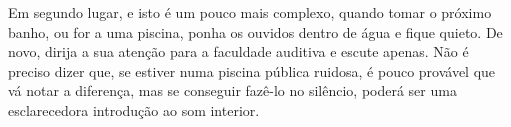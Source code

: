 Em segundo lugar, e isto é um pouco mais complexo, quando tomar o
próximo banho, ou for a uma piscina, ponha os ouvidos dentro de água e
fique quieto. De novo, dirija a sua atenção para a faculdade auditiva e
escute apenas. Não é preciso dizer que, se estiver numa piscina pública
ruidosa, é pouco provável que vá notar a diferença, mas se conseguir
fazê-lo no silêncio, poderá ser uma esclarecedora introdução ao som
interior.

